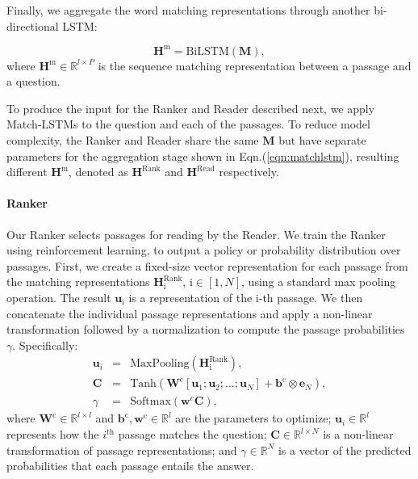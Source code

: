 \documentclass[letterpaper]{article} \usepackage{aaai18}  \usepackage{times}  \usepackage{helvet}  \usepackage{courier}  \usepackage{url}  \usepackage{graphicx}  \usepackage{comment}
\begin{document}
Finally, we aggregate the word matching representations through another bi-directional LSTM:


\begin{equation}
\mathbf{H}^{\text{m}} = \text{BiLSTM} (\mathbf{M}),
\label{eqn:matchlstm}
\end{equation}
where $\mathbf{H}^{\text{m}} \in \mathbb{R}^{l\times P}$ is the sequence matching representation between a passage and a question.

To produce the input for the Ranker and Reader described next, we apply Match-LSTMs to the question and each of the passages.  To reduce model complexity, the Ranker and Reader share the same $\mathbf{M}$ but have separate parameters for the aggregation stage shown in Eqn.(\ref{eqn:matchlstm}), resulting different $\mathbf{H}^{\text{m}}$, denoted as $\mathbf{H}^{\text{Rank}}$ and $\mathbf{H}^{\text{Read}}$ respectively.


\paragraph{Ranker}
Our Ranker selects passages for reading by the Reader.
We train the Ranker using reinforcement learning, to output a policy or probability distribution over passages. 
First, we create a fixed-size vector  representation for each passage from the matching representations  $\mathbf{H}^{\text{Rank}}_{\text{i}}$, $\text{i} \in [1,N]$, using a standard max pooling operation.  The result $\textbf{u}_{\text{i}}$ is a representation of the $\text{i}$-th passage. We then concatenate the individual passage representations and apply a non-linear transformation followed by a normalization to compute the passage probabilities $\gamma$.  Specifically:
\begin{eqnarray}
\nonumber
\textbf{u}_i &=& \text{MaxPooling}(\mathbf{H}^{\text{Rank}}_\text{i}), \\
\nonumber
\mathbf{C} &=& \text{Tanh}\left( \mathbf{W}^\text{c}[\textbf{u}_1;\textbf{u}_2;...;\textbf{u}_N] + \mathbf{b}^\text{c} \otimes \mathbf{e}_{N} \right ), \\
\gamma &=& \text{Softmax}(\mathbf{w}^c \mathbf{C}),
\label{eqn:gamma}
\end{eqnarray}
where $\mathbf{W}^\text{c}\in \mathbb{R}^{l\times l}$ and $\mathbf{b}^\text{c},\mathbf{w}^\text{c}\in \mathbb{R}^{l}$ are the parameters to optimize; $\textbf{u}_i \in \mathbb{R}^{l}$ represents how the $i^{\text{th}}$ passage matches the question; $\mathbf{C}\in \mathbb{R}^{l\times N}$ is a non-linear transformation of passage representations; and $\gamma\in \mathbb{R}^N$ is a vector of the predicted probabilities that each passage entails the answer.
\end{document}
